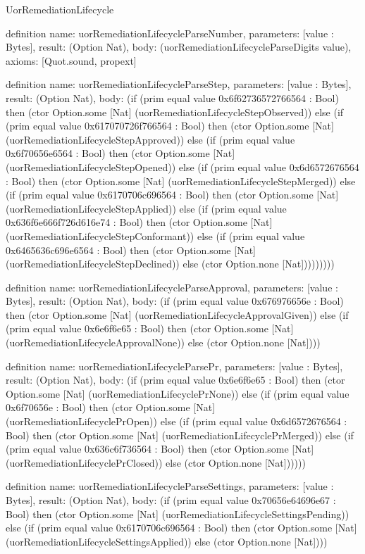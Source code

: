 \begin{lexlean}{UorRemediationLifecycle}
\begin{semanticmodule}
definition{
  name: uorRemediationLifecycleParseNumber,
  parameters: [value : Bytes],
  result: (Option Nat),
  body: (uorRemediationLifecycleParseDigits value),
  axioms: [Quot.sound, propext]
}

definition{
  name: uorRemediationLifecycleParseStep,
  parameters: [value : Bytes],
  result: (Option Nat),
  body: (if (prim equal value 0x6f62736572766564 : Bool) then (ctor Option.some [Nat] (uorRemediationLifecycleStepObserved)) else (if (prim equal value 0x617070726f766564 : Bool) then (ctor Option.some [Nat] (uorRemediationLifecycleStepApproved)) else (if (prim equal value 0x6f70656e6564 : Bool) then (ctor Option.some [Nat] (uorRemediationLifecycleStepOpened)) else (if (prim equal value 0x6d6572676564 : Bool) then (ctor Option.some [Nat] (uorRemediationLifecycleStepMerged)) else (if (prim equal value 0x6170706c696564 : Bool) then (ctor Option.some [Nat] (uorRemediationLifecycleStepApplied)) else (if (prim equal value 0x636f6e666f726d616e74 : Bool) then (ctor Option.some [Nat] (uorRemediationLifecycleStepConformant)) else (if (prim equal value 0x6465636c696e6564 : Bool) then (ctor Option.some [Nat] (uorRemediationLifecycleStepDeclined)) else (ctor Option.none [Nat]))))))))
}

definition{
  name: uorRemediationLifecycleParseApproval,
  parameters: [value : Bytes],
  result: (Option Nat),
  body: (if (prim equal value 0x676976656e : Bool) then (ctor Option.some [Nat] (uorRemediationLifecycleApprovalGiven)) else (if (prim equal value 0x6e6f6e65 : Bool) then (ctor Option.some [Nat] (uorRemediationLifecycleApprovalNone)) else (ctor Option.none [Nat])))
}

definition{
  name: uorRemediationLifecycleParsePr,
  parameters: [value : Bytes],
  result: (Option Nat),
  body: (if (prim equal value 0x6e6f6e65 : Bool) then (ctor Option.some [Nat] (uorRemediationLifecyclePrNone)) else (if (prim equal value 0x6f70656e : Bool) then (ctor Option.some [Nat] (uorRemediationLifecyclePrOpen)) else (if (prim equal value 0x6d6572676564 : Bool) then (ctor Option.some [Nat] (uorRemediationLifecyclePrMerged)) else (if (prim equal value 0x636c6f736564 : Bool) then (ctor Option.some [Nat] (uorRemediationLifecyclePrClosed)) else (ctor Option.none [Nat])))))
}

definition{
  name: uorRemediationLifecycleParseSettings,
  parameters: [value : Bytes],
  result: (Option Nat),
  body: (if (prim equal value 0x70656e64696e67 : Bool) then (ctor Option.some [Nat] (uorRemediationLifecycleSettingsPending)) else (if (prim equal value 0x6170706c696564 : Bool) then (ctor Option.some [Nat] (uorRemediationLifecycleSettingsApplied)) else (ctor Option.none [Nat])))
}


\end{semanticmodule}
\end{lexlean}
